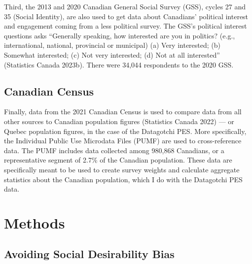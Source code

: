 \documentclass[
  letterpaper,
  DIV=11,
  numbers=noendperiod]{scrreprt}
\begin{document}
Third, the 2013 and 2020 Canadian General Social Survey (GSS), cycles 27
and 35 (Social Identity), are also used to get data about Canadians'
political interest and engagement coming from a less political survey.
The GSS's political interest questions asks ``Generally speaking, how
interested are you in politics? (e.g., international, national,
provincial or municipal) (a) Very interested; (b) Somewhat interested;
(c) Not very interested; (d) Not at all interested'' (Statistics Canada
2023b). There were 34,044 respondents to the 2020 GSS.

\hypertarget{canadian-census}{%
\subsection{Canadian Census}\label{canadian-census}}

Finally, data from the 2021 Canadian Census is used to compare data from
all other sources to Canadian population figures (Statistics Canada
2022) --- or Quebec population figures, in the case of the Datagotchi
PES. More specifically, the Individual Public Use Microdata Files (PUMF)
are used to cross-reference data. The PUMF includes data collected among
980,868 Canadians, or a representative segment of 2.7\% of the Canadian
population. These data are specifically meant to be used to create
survey weights and calculate aggregate statistics about the Canadian
population, which I do with the Datagotchi PES data.

\hypertarget{methods}{%
\section{Methods}\label{methods}}

\hypertarget{avoiding-social-desirability-bias}{%
\subsection{Avoiding Social Desirability
Bias}\label{avoiding-social-desirability-bias}}
\end{document}
